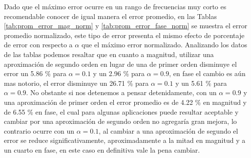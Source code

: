 Dado que el máximo error ocurre en un rango de frecuencias muy corto es recomendable conocer de igual manera el error promedio, en las Tablas \ref{tab:prom_error_mag_norm} y \ref{tab:prom_error_fase_norm} se muestra el error promedio normalizado, este tipo de error presenta el mismo efecto de porcentaje de error con respecto a $\alpha$ que el máximo error normalizado. Analizando los datos de las tablas podemos resaltar que en cuanto a magnitud, utilizar una aproximación de segundo orden en lugar de una de primer orden disminuye el error un 5.86 \% para $\alpha = 0.1$ y un 2.96 \% para $\alpha = 0.9$, en fase el cambio es aún mas notorio, el error disminuye un 26.71 \% para $\alpha = 0.1$ y un 5.61 \% para $\alpha = 0.9$. No obstante si nos detenemos a pensar detenidamente, con un $\alpha=0.9$ y una aproximación de primer orden el error promedio es de 4.22 \% en magnitud y de 6.55 \% en fase, el cual para algunas aplicaciones puede resultar aceptable y cambiar por una aproximación de segundo orden no agregaría gran mejora, lo contrario ocurre con un $\alpha=0.1$, al cambiar a una aproximación de segundo el error se reduce significativamente, aproximadamente a la mitad en magnitud y a un cuarto en fase, en este caso en definitiva vale la pena cambiar.

